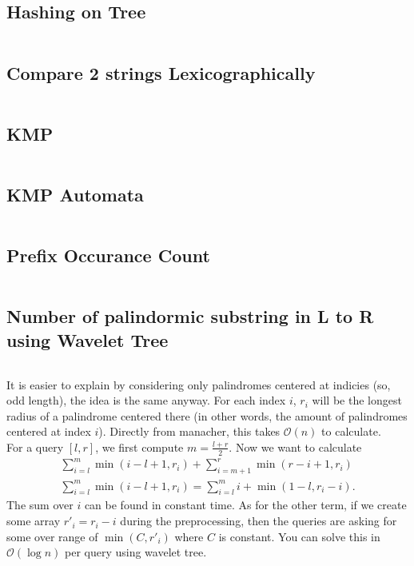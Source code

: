 \subsection{\small Hashing on Tree  \scriptsize}
\inputminted[breaklines, breakanywhere]{c++}{code/08-String/04-Hashing on Tree.cpp}

\subsection{\small Compare 2 strings Lexicographically   \scriptsize}
\inputminted[breaklines, breakanywhere]{c++}{code/08-String/05-Compare 2 strings Lexicographically .cpp}

\subsection{\small KMP  \scriptsize}
\inputminted[breaklines, breakanywhere]{c++}{code/08-String/06-KMP.cpp}

\subsection{\small KMP Automata  \scriptsize}
\inputminted[breaklines, breakanywhere]{c++}{code/08-String/07-KMP Automata.cpp}

\subsection{\small Prefix Occurance Count  \scriptsize}
\inputminted[breaklines, breakanywhere]{c++}{code/08-String/08-Prefix Occurance Count.cpp}

\subsection{\small Number of palindormic substring in L to R using Wavelet Tree  \scriptsize}
\inputminted[breaklines, breakanywhere]{c++}{code/08-String/09-Number of palindormic substring in L to R using Wavelet Tree.cpp}

{\footnotesize
{
    It is easier to explain by considering only palindromes centered at indicies (so, odd length), the idea is the same anyway. For each index $i$, $r_i$ will be the longest radius of a palindrome centered there (in other words, the amount of palindromes centered at index $i$). Directly from manacher, this takes $\mathcal{O}(n)$ to calculate. \\

For a query $[l, r]$, we first compute $m = \frac{l+r}{2}$. Now we want to calculate
\begin{align*}
    \sum_{i=l}^{m} \min(i - l + 1, r_i) + 
    \sum_{i=m+1}^{r} \min(r - i + 1, r_i) \\
    \sum_{i=l}^{m} \min(i - l + 1, r_i) =
    \sum_{i=l}^{m} i + \min(1 - l, r_i - i).
\end{align*}
The sum over $i$ can be found in constant time. As for the other term, if we create some array $r'_{i} = r_i - i$ during the preprocessing, then the queries are asking for some over range of $\min(C, r'_{i})$ where $C$ is constant. You can solve this in $\mathcal{O}(\log n)$ per query using wavelet tree.
}
}

